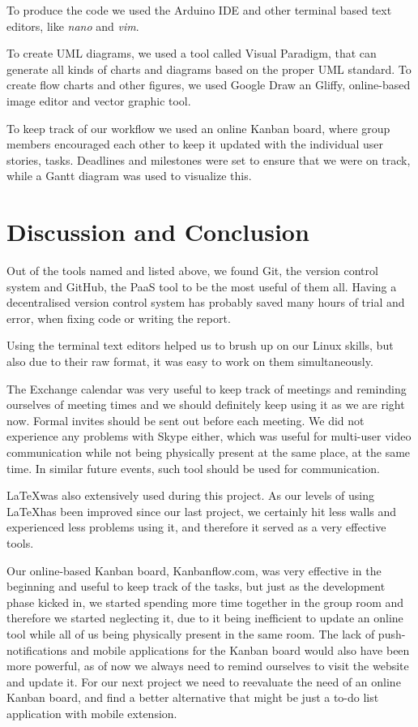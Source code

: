 To produce the code we used the Arduino IDE and other terminal based text editors, like \textit{nano} and \textit{vim}.

To create UML diagrams, we used a tool called Visual Paradigm, that can generate all kinds of charts and diagrams based on the proper UML standard. To create flow charts and other figures, we used Google Draw an Gliffy,  online-based image editor and vector graphic tool.

To keep track of our workflow we used an online Kanban board, where group members encouraged each other to keep it updated with the individual user stories, tasks. Deadlines and milestones were set to ensure that we were on track, while a Gantt diagram was used to visualize this.

\section{Discussion and Conclusion}
Out of the tools named and listed above, we found Git, the version control system and GitHub, the PaaS tool to be the most useful of them all. Having a decentralised version control system has probably saved many hours of trial and error, when fixing code or writing the report. 

Using the terminal text editors helped us to brush up on our Linux skills, but also due to their raw format, it was easy to work on them simultaneously. 

The Exchange calendar was very useful to keep track of meetings and reminding ourselves of meeting times and we should definitely keep using it as we are right now. Formal invites should be sent out before each meeting. We did not experience any problems with Skype either, which was useful for multi-user video communication while not being physically present at the same place, at the same time. In similar future events, such tool should be used for communication.

\LaTeX was also extensively used during this project. As our levels of using \LaTeX has been improved since our last project, we certainly hit less walls and experienced less problems using it, and therefore it served as a very effective tools.

Our online-based Kanban board, Kanbanflow.com, was very effective in the beginning and useful to keep track of the tasks, but just as the development phase kicked in, we started spending more time together in the group room and therefore we started neglecting it, due to it being inefficient to update an online tool while all of us being physically present in the same room. The lack of push-notifications and mobile applications for the Kanban board would also have been more powerful, as of now we always need to remind ourselves to visit the website and update it. For our next project we need to reevaluate the need of an online Kanban board, and find a better alternative that might be just a to-do list application with mobile extension.



